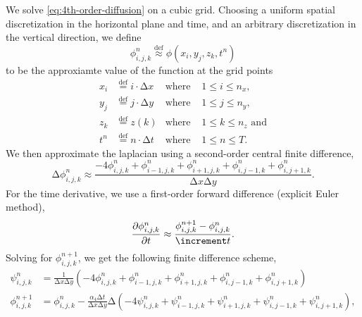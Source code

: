 \documentclass[british]{scrreprt}
\renewcommand\laplacian{\increment}
\begin{document}
We solve \cref{eq:4th-order-diffusion} on a cubic grid. Choosing a uniform spatial discretization in the horizontal plane and time, and an arbitrary discretization in the vertical direction, we define
\begin{equation}
	\phi_{i, j, k}^{n} \stackrel{\mathrm{def}}{\approx} \phi(x_{i}, y_{j}, z_{k}, t^{n})
\end{equation}
to be the approxiamte value of the function at the grid points
\begin{subequations}
	\begin{align}
		x_{i} &\stackrel{\mathrm{def}}{=} i \cdot \increment x &\text{where } &1 \leq i \leq n_{x}, \\
		y_{j} &\stackrel{\mathrm{def}}{=} j \cdot \increment y &\text{where } &1 \leq j \leq n_{y}, \\
		z_{k} &\stackrel{\mathrm{def}}{=} z(k)                 &\text{where } &1 \leq k \leq n_{z} \text{ and} \\
		t^{n} &\stackrel{\mathrm{def}}{=} n \cdot \increment t &\text{where } &1 \leq n \leq T.
	\end{align}
\end{subequations}
We then approximate the laplacian using a second-order central finite difference,
\begin{equation}
	\laplacian \phi_{i, j, k}^{n} \approx
		\frac{-4 \phi_{i, j, k}^{n} + \phi_{i - 1, j, k}^{n} + \phi_{i + 1, j, k}^{n} + \phi_{i, j - 1, k}^{n} + \phi_{i, j + 1, k}^{n}}{\increment x \increment y}.
\end{equation}
For the time derivative, we use a first-order forward difference (explicit Euler method),
\begin{equation}
	\pdv{\phi_{i, j, k}^{n}}{t} \approx \frac{\phi_{i, j, k}^{n + 1} - \phi_{i, j, k}^{n}}{\increment t}.
\end{equation}
Solving for $\phi_{i, j, k}^{n + 1}$, we get the following finite difference scheme,
\begin{subequations}
	\begin{align}
		\psi_{i, j, k}^{n} &=
			\frac{1}{\increment x \increment y} \left(
				-4 \phi_{i,     j,     k}^{n}
				+  \phi_{i - 1, j,     k}^{n}
				+  \phi_{i + 1, j,     k}^{n}
				+  \phi_{i,     j - 1, k}^{n}
				+  \phi_{i,     j + 1, k}^{n}
			\right) \label{eq:laplap1} \\
		\phi_{i, j, k}^{n + 1} &=
			\phi_{i, j, k}^{n} - \frac{\alpha_{4} \increment t}{\increment x \increment y} \laplacian \left(
				-4 \psi_{i,     j,     k}^{n}
				+  \psi_{i - 1, j,     k}^{n}
				+  \psi_{i + 1, j,     k}^{n}
				+  \psi_{i,     j - 1, k}^{n}
				+  \psi_{i,     j + 1, k}^{n}
			\right), \label{eq:laplap2}
	\end{align}
\end{subequations}
\end{document}
